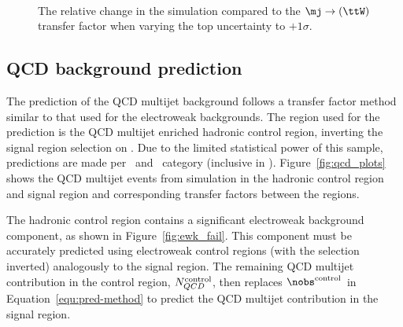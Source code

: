 \begin{figure}[!h]
  \centering
   ~~
  \\
  \caption{\label{fig:tfSimVar} The relative change in the
  \ttW simulation compared to the $\mj \rightarrow (\ttW)$ transfer
  factor when varying the top \pt uncertainty to $+1\sigma$.
  }
\end{figure}

\subsection{QCD background prediction}

The prediction of the QCD multijet background follows a transfer factor method
similar to that used for the electroweak backgrounds. The region used
for the prediction is the QCD multijet enriched hadronic control region, 
inverting the signal region selection on \mhtmet. Due to the limited statistical
power of this sample, predictions are made per \njet~and \scalht~category (inclusive in \nb).
Figure~\ref{fig:qcd_plots} shows the QCD multijet events from simulation 
in the hadronic control region and signal region and corresponding transfer factors
between the regions.

The hadronic control region contains a significant electroweak background component, 
as shown in Figure~\ref{fig:ewk_fail}. This component must be accurately predicted
using electroweak control regions (with the \mhtmet selection inverted) analogously 
to the signal region. The remaining QCD multijet contribution in the control region,
$N_{QCD}^{\rm control}$, then replaces $\nobs^{\rm control}$ in Equation~\ref{equ:pred-method} 
to predict the QCD multijet contribution in the signal region. 

